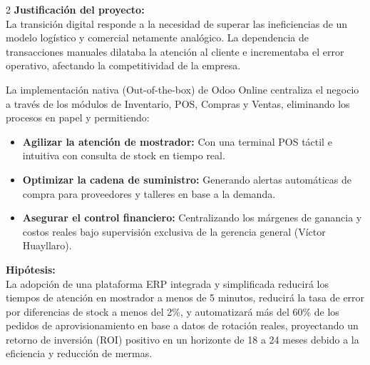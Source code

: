 \documentclass[12pt]{article}
\begin{document}
\begin{multicols}{2}
\textbf{Justificación del proyecto:}\\
La transición digital responde a la necesidad de superar las ineficiencias de un modelo logístico y comercial netamente analógico. La dependencia de transacciones manuales dilataba la atención al cliente e incrementaba el error operativo, afectando la competitividad de la empresa.

La implementación nativa (Out-of-the-box) de Odoo Online centraliza el negocio a través de los módulos de Inventario, POS, Compras y Ventas, eliminando los procesos en papel y permitiendo:
\begin{itemize}
    \item \textbf{Agilizar la atención de mostrador:} Con una terminal POS táctil e intuitiva con consulta de stock en tiempo real.
    \item \textbf{Optimizar la cadena de suministro:} Generando alertas automáticas de compra para proveedores y talleres en base a la demanda.
    \item \textbf{Asegurar el control financiero:} Centralizando los márgenes de ganancia y costos reales bajo supervisión exclusiva de la gerencia general (Víctor Huayllaro).
\end{itemize}

\textbf{Hipótesis:}\\
La adopción de una plataforma ERP integrada y simplificada reducirá los tiempos de atención en mostrador a menos de 5 minutos, reducirá la tasa de error por diferencias de stock a menos del 2\%, y automatizará más del 60\% de los pedidos de aprovisionamiento en base a datos de rotación reales, proyectando un retorno de inversión (ROI) positivo en un horizonte de 18 a 24 meses debido a la eficiencia y reducción de mermas.


\end{multicols}
\end{document}
